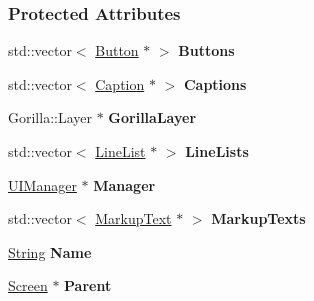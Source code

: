 \subsubsection*{Protected Attributes}
\begin{DoxyCompactItemize}
\item 
\hypertarget{classphys_1_1UI_1_1Layer_a2d12e01d6a76ad0a101022fee53a79b7}{
std::vector$<$ \hyperlink{classphys_1_1UI_1_1Button}{Button} $\ast$ $>$ {\bfseries Buttons}}
\label{classphys_1_1UI_1_1Layer_a2d12e01d6a76ad0a101022fee53a79b7}

\item 
\hypertarget{classphys_1_1UI_1_1Layer_a758d8888e65e3f2c6ebd83acc9e93cb2}{
std::vector$<$ \hyperlink{classphys_1_1UI_1_1Caption}{Caption} $\ast$ $>$ {\bfseries Captions}}
\label{classphys_1_1UI_1_1Layer_a758d8888e65e3f2c6ebd83acc9e93cb2}

\item 
\hypertarget{classphys_1_1UI_1_1Layer_a2070c97455f89015d36f2c84f4153369}{
Gorilla::Layer $\ast$ {\bfseries GorillaLayer}}
\label{classphys_1_1UI_1_1Layer_a2070c97455f89015d36f2c84f4153369}

\item 
\hypertarget{classphys_1_1UI_1_1Layer_a22ce4eb08d5b048d6152fbcb8b74f4c4}{
std::vector$<$ \hyperlink{classphys_1_1UI_1_1LineList}{LineList} $\ast$ $>$ {\bfseries LineLists}}
\label{classphys_1_1UI_1_1Layer_a22ce4eb08d5b048d6152fbcb8b74f4c4}

\item 
\hypertarget{classphys_1_1UI_1_1Layer_a7f735d502a8673b9faff0cbe773392c5}{
\hyperlink{classphys_1_1UIManager}{UIManager} $\ast$ {\bfseries Manager}}
\label{classphys_1_1UI_1_1Layer_a7f735d502a8673b9faff0cbe773392c5}

\item 
\hypertarget{classphys_1_1UI_1_1Layer_acb81eeceade2327d972cb8c91dfa31db}{
std::vector$<$ \hyperlink{classphys_1_1UI_1_1MarkupText}{MarkupText} $\ast$ $>$ {\bfseries MarkupTexts}}
\label{classphys_1_1UI_1_1Layer_acb81eeceade2327d972cb8c91dfa31db}

\item 
\hypertarget{classphys_1_1UI_1_1Layer_a0e543975ce2486ef466f3a6a2200d717}{
\hyperlink{namespacephys_aa03900411993de7fbfec4789bc1d392e}{String} {\bfseries Name}}
\label{classphys_1_1UI_1_1Layer_a0e543975ce2486ef466f3a6a2200d717}

\item 
\hypertarget{classphys_1_1UI_1_1Layer_a1339f7386d3540d6025417d3d2d5c6e3}{
\hyperlink{classphys_1_1UI_1_1Screen}{Screen} $\ast$ {\bfseries Parent}}
\label{classphys_1_1UI_1_1Layer_a1339f7386d3540d6025417d3d2d5c6e3}


\end{DoxyCompactItemize}
